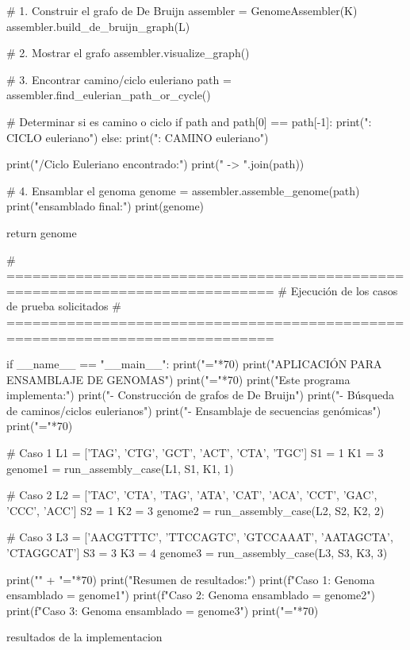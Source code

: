 \documentclass[fleqn,10pt]{article}
\begin{document}
    # 1. Construir el grafo de De Bruijn
    assembler = GenomeAssembler(K)
    assembler.build_de_bruijn_graph(L)
    
    # 2. Mostrar el grafo
    assembler.visualize_graph()
    
    # 3. Encontrar camino/ciclo euleriano
    path = assembler.find_eulerian_path_or_cycle()
    
    # Determinar si es camino o ciclo
    if path and path[0] == path[-1]:
        print("\nTipo: CICLO euleriano")
    else:
        print("\nTipo: CAMINO euleriano")
    
    print("\nCamino/Ciclo Euleriano encontrado:")
    print(" -> ".join(path))
    
    # 4. Ensamblar el genoma
    genome = assembler.assemble_genome(path)
    print("\nGenoma ensamblado final:")
    print(genome)
    
    return genome


# =============================================================================
# Ejecución de los casos de prueba solicitados
# =============================================================================

if __name__ == "__main__":
    print("="*70)
    print("APLICACIÓN PARA ENSAMBLAJE DE GENOMAS")
    print("="*70)
    print("Este programa implementa:")
    print("- Construcción de grafos de De Bruijn")
    print("- Búsqueda de caminos/ciclos eulerianos")
    print("- Ensamblaje de secuencias genómicas")
    print("="*70)
    
    # Caso 1
    L1 = ['TAG', 'CTG', 'GCT', 'ACT', 'CTA', 'TGC']
    S1 = 1
    K1 = 3
    genome1 = run_assembly_case(L1, S1, K1, 1)
    
    # Caso 2
    L2 = ['TAC', 'CTA', 'TAG', 'ATA', 'CAT', 'ACA', 'CCT', 'GAC', 'CCC', 'ACC']
    S2 = 1
    K2 = 3
    genome2 = run_assembly_case(L2, S2, K2, 2)
    
    # Caso 3
    L3 = ['AACGTTTC', 'TTCCAGTC', 'GTCCAAAT', 'AATAGCTA', 'CTAGGCAT']
    S3 = 3
    K3 = 4
    genome3 = run_assembly_case(L3, S3, K3, 3)
    
    print("\n" + "="*70)
    print("Resumen de resultados:")
    print(f"Caso 1: Genoma ensamblado = {genome1}")
    print(f"Caso 2: Genoma ensamblado = {genome2}")
    print(f"Caso 3: Genoma ensamblado = {genome3}")
    print("="*70)

    resultados de la implementacion 
    
\end{document}
